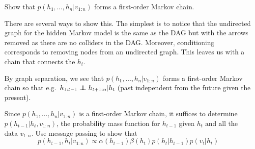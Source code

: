 \begin{exenumerate}
\item Show that $p(h_1, \ldots, h_n|v_{1:n})$ forms a
  first-order Markov chain.

  \begin{solution}
    There are several ways to show this. The simplest is to notice
    that the undirected graph for the hidden Markov model is the same
    as the DAG but with the arrows removed as there are no colliders
    in the DAG. Moreover, conditioning corresponds to removing nodes
    from an undirected graph. This leaves us with a chain that
    connects the $h_i$.
    \begin{center}
    \end{center}
    
  By graph separation, we see that $p(h_1,\ldots, h_n|v_{1:n})$ forms
  a first-order Markov chain so that e.g.\ $h_{1:t-1} \mathrel{\perp\mspace{-10mu}\perp}
  h_{t+1:n} | h_t$ (past independent from the future given the
  present).
    
  \end{solution}
  
  \item Since $p(h_1, \ldots, h_n|v_{1:n})$ is a first-order Markov
    chain, it suffices to determine $p(h_{t-1}|h_t, v_{1:n})$, the
    probability mass function for $h_{t-1}$ given $h_t$ and
    all the data $v_{1:n}$. Use message passing to show
    that
    \begin{equation}
      p(h_{t-1}, h_t| v_{1:n}) \propto \alpha(h_{t-1}) \beta(h_t) p(h_t|h_{t-1})p(v_t|h_t) 
    \end{equation}


\end{exenumerate}
